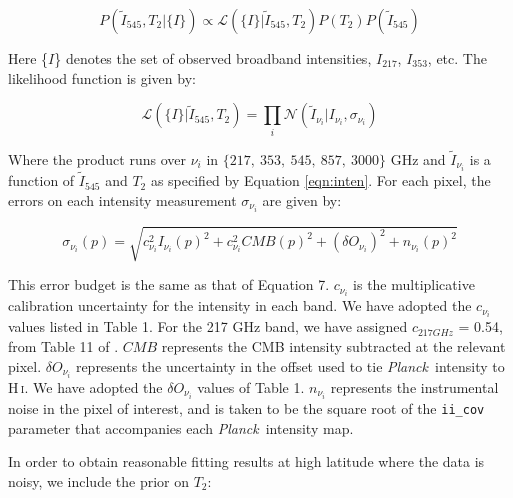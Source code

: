 \documentclass{emulateapj}
\newcommand{\PLANCK}{{\it Planck}}
\begin{document}
\begin{equation}
\label{eqn:post}
P(\tilde{I}_{545}, T_2|\{I\}) \propto \mathcal{L}(\{I\}|\tilde{I}_{545}, T_2)P(T_2)P(\tilde{I}_{545})
\end{equation}


Here \{$I$\} denotes the set of observed broadband intensities, $I_{217}$, 
$I_{353}$, etc. The likelihood function is given by:

\begin{equation} \label{equ:like}
\mathcal{L}(\{I\}|\tilde{I}_{545}, T_2) = \displaystyle\prod\limits_{i}\mathcal{N}(\tilde{I}_{\nu_{i}}|I_{\nu_{i}}, \sigma_{\nu_i})
\end{equation}


Where the product runs over $\nu_i$ in $\{217,\ 353,\ 545,\ 857,\ 3000\}$ GHz
and $\tilde{I}_{\nu_i}$ is a function of $\tilde{I}_{545}$ and $T_2$ as 
specified by Equation \ref{eqn:inten}. For each pixel, the errors on each 
intensity measurement $\sigma_{\nu_i}$ are given by:

\begin{equation}
\sigma_{\nu_i}(p) = \sqrt{c^2_{\nu_i}I_{\nu_i}(p)^2 + c^2_{\nu_i}CMB(p)^2 + (\delta O_{\nu_i})^2 + n_{\nu_i}(p)^2}
\end{equation}


This error budget is the same as that of \cite{planckdust} Equation 7. 
$c_{\nu_i}$ is the multiplicative calibration uncertainty for the intensity in 
each band. We have adopted the $c_{\nu_i}$ values listed in \cite{planckdust} 
Table 1. For the 217 GHz band, we have assigned $c_{217 GHz}$ = 0.54, from 
Table 11 of \cite{planckcalib}. $CMB$ represents the CMB intensity 
subtracted at the relevant pixel. $\delta O_{\nu_i}$ represents the uncertainty
in the offset used to tie \PLANCK~intensity to H\,\textsc{i}. We have adopted 
the  $\delta O_{\nu_i}$ values of \cite{planckdust} Table 1. $n_{\nu_i}$ 
represents the instrumental noise in the pixel of interest, and is taken to be 
the square root of the \verb|ii_cov| parameter that accompanies each 
\PLANCK~intensity map.

In order to obtain reasonable fitting results at high latitude where the data 
is noisy, we include the prior on $T_2$:
\end{document}
